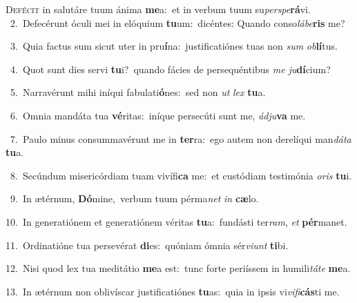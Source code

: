 \lettrine{\initial\textcolor{\initialcolor}{D}}{efécit} in salutáre tuum ánima \textbf{me}\-a:~\star et in verbum tuum su\-\textit{per}\-\textit{spe}\textbf{rá}vi.\\
{\numbfont\textcolor{\numbcolor}{~2.}}~Defecérunt óculi mei in elóquium \textbf{tu}\-um:~\star dicéntes: Quando conso\-\textit{lá}\-\textit{be}\textbf{ris} me?\par
{\numbfont\textcolor{\numbcolor}{~3.}}~Quia factus sum sicut uter in pru\-\textbf{í}\-na:~\star justificatiónes tuas non \textit{sum} \textit{ob}\-\textbf{lí}tus.\par
{\numbfont\textcolor{\numbcolor}{~4.}}~Quot sunt dies servi \textbf{tu}\-i?~\star quando fácies de persequéntibus \textit{me} \textit{ju}\-\textbf{dí}cium?\par
{\numbfont\textcolor{\numbcolor}{~5.}}~Narravérunt mihi iníqui fabulati\-\textbf{ó}\-nes:~\star sed non \textit{ut} \textit{lex} \textbf{tu}\-a.\par
{\numbfont\textcolor{\numbcolor}{~6.}}~Omnia mandáta tua \textbf{vé}\-ritas:~\star iníque persecúti sunt me, \textit{ád}\-\textit{ju}\textbf{va} me.\par
{\numbfont\textcolor{\numbcolor}{~7.}}~Paulo minus consummavérunt me in \textbf{ter}\-ra:~\star ego autem non derelíqui man\-\textit{dá}\-\textit{ta} \textbf{tu}\-a.\par
{\numbfont\textcolor{\numbcolor}{~8.}}~Secúndum misericórdiam tuam vivífi\textbf{ca} me:~\star et custódiam testimónia \textit{o}\-\textit{ris} \textbf{tu}\-i.\par
{\numbfont\textcolor{\numbcolor}{~9.}}~In ætérnum, \textbf{Dó}\-mine,~\star verbum tuum pérma\textit{net} \textit{in} \textbf{cæ}\-lo.\par
{\numbfont\textcolor{\numbcolor}{10.}}~In generatiónem et generatiónem véritas \textbf{tu}\-a:~\star fundásti ter\-\textit{ram}\-, \textit{et} \textbf{pér}\-manet.\par
{\numbfont\textcolor{\numbcolor}{11.}}~Ordinatióne tua persevérat \textbf{di}\-es:~\star quóniam ómnia sér\-\textit{vi}\-\textit{unt} \textbf{ti}\-bi.\par
{\numbfont\textcolor{\numbcolor}{12.}}~Nisi quod lex tua meditátio \textbf{me}\-a est:~\star tunc forte periíssem in humili\-\textit{tá}\-\textit{te} \textbf{me}\-a.\par
{\numbfont\textcolor{\numbcolor}{13.}}~In ætérnum non oblivíscar justificatiónes \textbf{tu}\-as:~\star quia in ipsis vi\-\textit{vi}\-\textit{fi}\textbf{cás}ti me.\par
